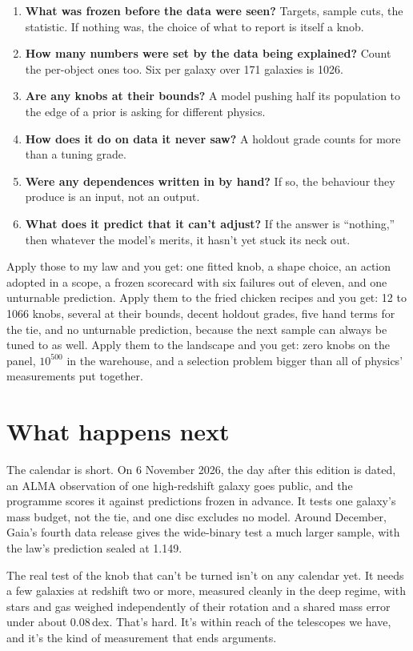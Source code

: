 \begin{enumerate}
\item \textbf{What was frozen before the data were seen?} Targets, sample cuts, the statistic. If nothing was, the choice of what to report is itself a knob.
\item \textbf{How many numbers were set by the data being explained?} Count the per-object ones too. Six per galaxy over 171 galaxies is 1026.
\item \textbf{Are any knobs at their bounds?} A model pushing half its population to the edge of a prior is asking for different physics.
\item \textbf{How does it do on data it never saw?} A holdout grade counts for more than a tuning grade.
\item \textbf{Were any dependences written in by hand?} If so, the behaviour they produce is an input, not an output.
\item \textbf{What does it predict that it can't adjust?} If the answer is ``nothing,'' then whatever the model's merits, it hasn't yet stuck its neck out.
\end{enumerate}

Apply those to my law and you get: one fitted knob, a shape choice, an action adopted in a scope, a frozen scorecard with six failures out of eleven, and one unturnable prediction. Apply them to the fried chicken recipes and you get: 12 to 1066 knobs, several at their bounds, decent holdout grades, five hand terms for the tie, and no unturnable prediction, because the next sample can always be tuned to as well. Apply them to the landscape and you get: zero knobs on the panel, $10^{500}$ in the warehouse, and a selection problem bigger than all of physics' measurements put together.

\section{What happens next}

The calendar is short. On 6 November 2026, the day after this edition is dated, an ALMA observation of one high-redshift galaxy goes public, and the programme scores it against predictions frozen in advance. It tests one galaxy's mass budget, not the tie, and one disc excludes no model. Around December, Gaia's fourth data release gives the wide-binary test a much larger sample, with the law's prediction sealed at 1.149.

The real test of the knob that can't be turned isn't on any calendar yet. It needs a few galaxies at redshift two or more, measured cleanly in the deep regime, with stars and gas weighed independently of their rotation and a shared mass error under about 0.08\,dex. That's hard. It's within reach of the telescopes we have, and it's the kind of measurement that ends arguments.

